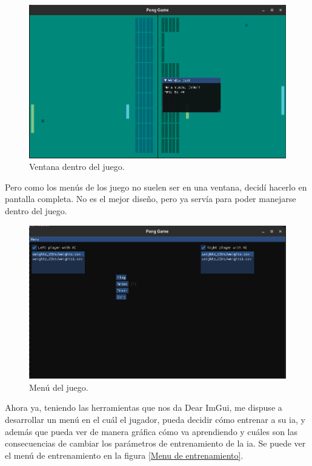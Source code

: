 \begin{figure}[H]
	\centering
	\includegraphics[width=15cm]{archivos/imagenes/ventana-dentro-del-juego.png}
	\caption{Ventana dentro del juego.}
\end{figure}
Pero como los menús de los juego no suelen ser en una ventana, decidí hacerlo en pantalla completa. No es el mejor diseño, pero ya servía para poder manejarse  dentro del juego.
\begin{figure}[H]
	\centering
	\includegraphics[width=15cm]{archivos/imagenes/menu-del-juego.png}
	\caption{Menú del juego.}
	\label{Menu del juego}
\end{figure}
Ahora ya, teniendo las herramientas que nos da Dear ImGui, me dispuse a desarrollar un menú en el cuál el jugador, pueda decidir cómo entrenar a su \gls{ia}, y además que pueda ver de manera gráfica cómo va aprendiendo y cuáles son las consecuencias de cambiar los parámetros de entrenamiento de la \gls{ia}. Se puede ver el menú de entrenamiento en la figura \ref{Menu de entrenamiento}.

